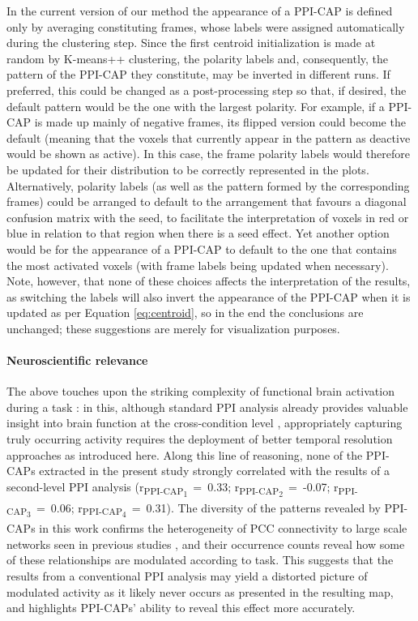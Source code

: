 In the current version of our method the appearance of a PPI-CAP is defined only by averaging constituting frames, whose labels were assigned automatically during the clustering step. Since the first centroid initialization is made at random by K-means++ clustering, the polarity labels and, consequently, the pattern of the PPI-CAP they constitute, may be inverted in different runs. If preferred, this could be changed as a post-processing step so that, if desired, the default pattern would be the one with the largest polarity. For example, if a PPI-CAP is made up mainly of negative frames, its flipped version could become the default (meaning that the voxels that currently appear in the pattern as deactive would be shown as active). In this case, the frame polarity labels would therefore be updated for their distribution to be correctly represented in the plots. Alternatively, polarity labels (as well as the pattern formed by the corresponding frames) could be arranged to default to the arrangement that favours a diagonal confusion matrix with the seed, to facilitate the interpretation of voxels in red or blue in relation to that region when there is a seed effect. Yet another option would be for the appearance of a PPI-CAP to default to the one that contains the most activated voxels (with frame labels being updated when necessary). Note, however, that none of these choices affects the interpretation of the results, as switching the labels will also invert the appearance of the PPI-CAP when it is updated as per Equation \ref{eq:centroid}, so in the end the conclusions are unchanged; these suggestions are merely for visualization purposes.   


\paragraph{Neuroscientific relevance}
The above touches upon the striking complexity of functional brain activation during a task \citep{Simony2016, Bolton2018a,Gonzalez-Castillo2018}: in this, although standard PPI analysis already provides valuable insight into brain function at the cross-condition level \citep{Kucyi2016a}, appropriately capturing truly occurring activity requires the deployment of better temporal resolution approaches as introduced here. Along this line of reasoning, none of the PPI-CAPs extracted in the present study strongly correlated with the results of a second-level PPI analysis (r\textsubscript{PPI-CAP\textsubscript{1}}~=~0.33; r\textsubscript{PPI-CAP\textsubscript{2}}~=~-0.07; r\textsubscript{PPI-CAP\textsubscript{3}}~=~0.06; r\textsubscript{PPI-CAP\textsubscript{4}}~=~0.31). The diversity of the patterns revealed by PPI-CAPs in this work confirms the heterogeneity of PCC connectivity to large scale networks seen in previous studies \citep{Liu2013,Karahanoglu2015a}, and their occurrence counts reveal how some of these relationships are modulated according to task.  This suggests that the results from a conventional PPI analysis may yield a distorted picture of modulated activity as it likely never occurs as presented in the resulting map, and highlights PPI-CAPs' ability to reveal this effect more accurately. 

